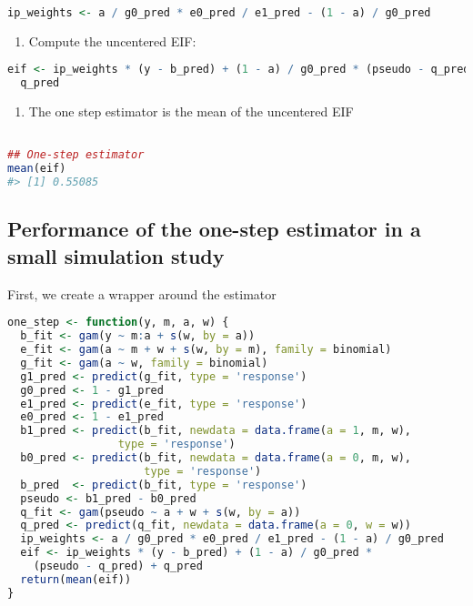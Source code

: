 \documentclass[
  12pt,
]{book}
\providecommand{\tightlist}{%
  \setlength{\itemsep}{0pt}\setlength{\parskip}{0pt}}
\theoremstyle{definition}
\theoremstyle{definition}
\theoremstyle{definition}
\newcommand{\1}{\mathbbm{1}}
\begin{document}
\begin{lstlisting}[language=R]
ip_weights <- a / g0_pred * e0_pred / e1_pred - (1 - a) / g0_pred
\end{lstlisting}

\begin{enumerate}
\def\labelenumi{\arabic{enumi}.}
\setcounter{enumi}{4}
\tightlist
\item
  Compute the uncentered EIF:
\end{enumerate}

\begin{lstlisting}[language=R]
eif <- ip_weights * (y - b_pred) + (1 - a) / g0_pred * (pseudo - q_pred) +
  q_pred
\end{lstlisting}

\begin{enumerate}
\def\labelenumi{\arabic{enumi}.}
\setcounter{enumi}{5}
\tightlist
\item
  The one step estimator is the mean of the uncentered EIF
\end{enumerate}

\begin{lstlisting}[language=R]

## One-step estimator
mean(eif)
#> [1] 0.55085
\end{lstlisting}

\hypertarget{performance-of-the-one-step-estimator-in-a-small-simulation-study}{%
\subsection{Performance of the one-step estimator in a small simulation study}\label{performance-of-the-one-step-estimator-in-a-small-simulation-study}}

First, we create a wrapper around the estimator

\begin{lstlisting}[language=R]
one_step <- function(y, m, a, w) {
  b_fit <- gam(y ~ m:a + s(w, by = a))
  e_fit <- gam(a ~ m + w + s(w, by = m), family = binomial)
  g_fit <- gam(a ~ w, family = binomial)
  g1_pred <- predict(g_fit, type = 'response')
  g0_pred <- 1 - g1_pred
  e1_pred <- predict(e_fit, type = 'response')
  e0_pred <- 1 - e1_pred
  b1_pred <- predict(b_fit, newdata = data.frame(a = 1, m, w),
                 type = 'response')
  b0_pred <- predict(b_fit, newdata = data.frame(a = 0, m, w),
                     type = 'response')
  b_pred  <- predict(b_fit, type = 'response')
  pseudo <- b1_pred - b0_pred
  q_fit <- gam(pseudo ~ a + w + s(w, by = a))
  q_pred <- predict(q_fit, newdata = data.frame(a = 0, w = w))
  ip_weights <- a / g0_pred * e0_pred / e1_pred - (1 - a) / g0_pred
  eif <- ip_weights * (y - b_pred) + (1 - a) / g0_pred *
    (pseudo - q_pred) + q_pred
  return(mean(eif))
}
\end{lstlisting}
\end{document}
